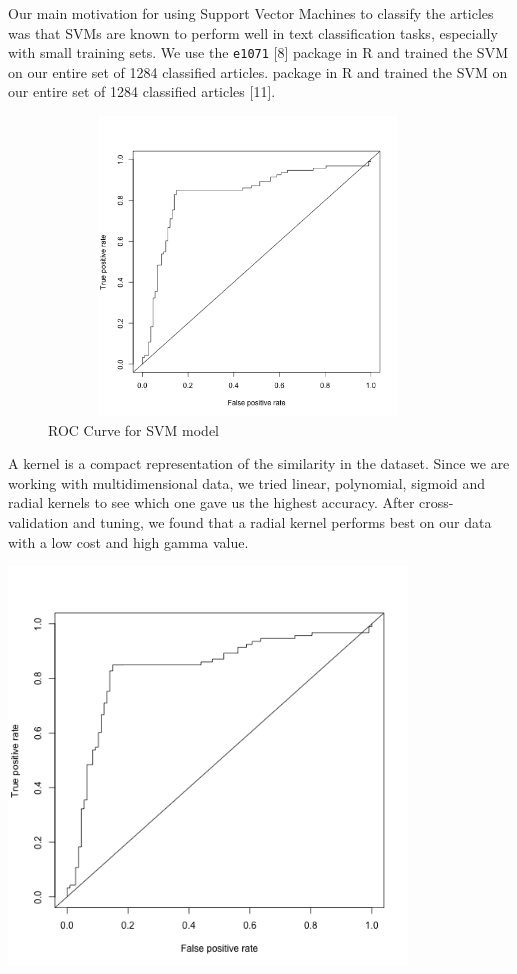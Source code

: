 \documentclass[10pt,letterpaper]{article}
\begin{document}
Our main motivation for using Support Vector Machines to classify the
articles was that SVMs are known to perform well in text classification
tasks, especially with small training sets. We use the \texttt{e1071}
{[}8{]} package in R and trained the SVM on our entire set of 1284
classified articles.
package in R and trained the SVM on our entire set of 1284 classified
articles {[}11{]}.

\begin{figure}
\includegraphics[width=400px,height=300px]{roc-curve} \caption{ROC Curve for SVM model}\label{fig:unnamed-chunk-5}
\end{figure}

A kernel is a compact representation of the similarity in the dataset.
Since we are working with multidimensional data, we tried linear,
polynomial, sigmoid and radial kernels to see which one gave us the
highest accuracy. After cross-validation and tuning, we found that a
radial kernel performs best on our data with a low cost and high gamma
value.

\includegraphics[width=400px]{roc-curve}
\end{document}
